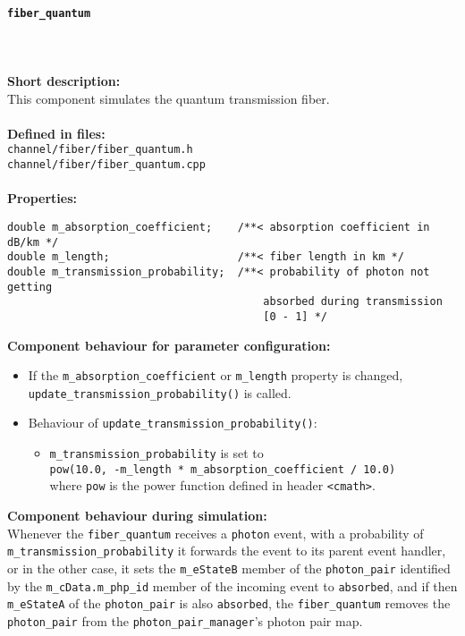\paragraph{\texttt{fiber\_quantum}}
\noindent \\
\\
\textbf{Short description:}\\
This component simulates the quantum transmission fiber.\\
\\
\textbf{Defined in files:}\\
\texttt{channel/fiber/fiber\_quantum.h}\\
\texttt{channel/fiber/fiber\_quantum.cpp}\\
\\
\textbf{Properties:}\\
\begin{lstlisting}
double m_absorption_coefficient;    /**< absorption coefficient in dB/km */
double m_length;                    /**< fiber length in km */
double m_transmission_probability;  /**< probability of photon not getting 
                                        absorbed during transmission
                                        [0 - 1] */
\end{lstlisting}
\noindent
\textbf{Component behaviour for parameter configuration:}
\begin{itemize}

\item If the \texttt{m\_absorption\_coefficient} or \texttt{m\_length} property is changed, \\
\texttt{update\_transmission\_probability()} is called.

\item Behaviour of \texttt{update\_transmission\_probability()}:

\begin{itemize}

\item \texttt{m\_transmission\_probability} is set to\\
\texttt{pow(10.0, -m\_length * m\_absorption\_coefficient / 10.0)}\\
where \texttt{pow} is the power function defined in header \texttt{<cmath>}.

\end{itemize}

\end{itemize}
\noindent
\textbf{Component behaviour during simulation:}\\
Whenever the \texttt{fiber\_quantum} receives a \texttt{photon} event, with a probability of \texttt{m\_transmission\_probability} it forwards the event to its parent event handler, or in the other case, it sets the \texttt{m\_eStateB} member of the \texttt{photon\_pair} identified by the \texttt{m\_cData.m\_php\_id} member of the incoming event to \texttt{absorbed}, and if then \texttt{m\_eStateA} of the \texttt{photon\_pair} is also \texttt{absorbed}, the \texttt{fiber\_quantum} removes the \texttt{photon\_pair} from the \texttt{photon\_pair\_manager}'s photon pair map.

